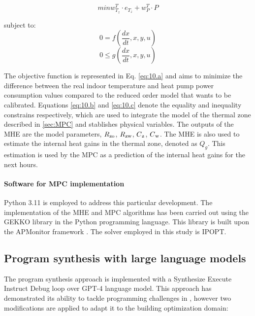 \begin{equation}
min w_{T_z}^T \cdot e_{T_z} + w_{P}^T \cdot P
\label{eq:10.a}
\end{equation}

subject to:
\begin{equation}
0=f(\frac{dx}{dt},x,y,u)
\label{eq:10.b}
\end{equation}
\begin{equation}
0\leq g(\frac{dx}{dt},x,y,u)
\label{eq:10.c}
\end{equation}

The objective function is represented in Eq. \ref{eq:10.a} and aims to minimize the difference between the real indoor temperature and heat pump power consumption values compared to the reduced order model that wants to be calibrated. Equations \ref{eq:10.b} and \ref{eq:10.c} denote the equality and inequality constrains respectively, which are used to integrate the model of the thermal zone described in \ref{sec:MPC} and stablishes physical variables. The outputs of the MHE are the model parameters, $R\textsubscript{zo}$, $R\textsubscript{zw}$, $C\textsubscript{z}$, $C\textsubscript{w}$. 
The MHE is also used to estimate the internal heat gains in the thermal zone, denoted as $Q_g$. This estimation is used by the MPC as a prediction of the internal heat gains for the next hours. 

\paragraph{Software for MPC implementation} Python 3.11 is employed to address this particular development. The implementation of the MHE and MPC algorithms has been carried out using the GEKKO library \cite{Beal2018} in the Python programming language. This library is built upon the APMonitor framework \cite{Hedengren2014}. The solver employed in this study is IPOPT.

\subsection{Program synthesis with large language models}
\label{sec:ProgramSynthesis}
The program synthesis approach is implemented with a Synthesize Execute Instruct Debug loop over GPT-4 \cite{GPT2023} language model. This approach has demonstrated its ability to tackle programming challenges in \cite{Reflexion2023,teaching2023,Fully2023}, however two modifications are applied to adapt it to the building optimization domain:

